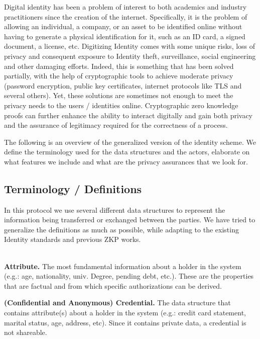 Digital identity has been a problem of interest to both academics and industry practitioners since the creation of the internet. Specifically, it is the problem of allowing an individual, a company, or an asset to be identified online without having to generate a physical identification for it, such as an ID card, a signed document, a license, etc. Digitizing Identity comes with some unique risks, loss of privacy and consequent exposure to Identity theft, surveillance, social engineering and other damaging efforts. Indeed, this is something that has been solved partially, with the help of cryptographic tools to achieve moderate privacy (password encryption, public key certificates, internet protocols like TLS and several others). Yet, these solutions are sometimes not enough to meet the privacy needs to the users / identities online. Cryptographic zero knowledge proofs can further enhance the ability to interact digitally and gain both privacy and the assurance of legitimacy required for the correctness of a process.
 
The following is an overview of the generalized version of the identity scheme. We define the terminology used for the data structures and the actors, elaborate on what features we include and what are the privacy assurances that we look for. 


\subsection{Terminology / Definitions}

In this protocol we use several different data structures to represent the information being transferred or exchanged between the parties. We have tried to generalize the definitions as much as possible, while adapting to the existing Identity standards and previous ZKP works.

\mbox{}\\
\textbf{Attribute.} The most fundamental information about a holder in the system (e.g.: age, nationality, univ. Degree, pending debt, etc.). These are the properties that are factual and from which specific authorizations can be derived.

\textbf{(Confidential and Anonymous) Credential.} The data structure that contains attribute(s) about a holder in the system (e.g.: credit card statement, marital status, age, address, etc). Since it contains private data, a credential is not shareable. 


